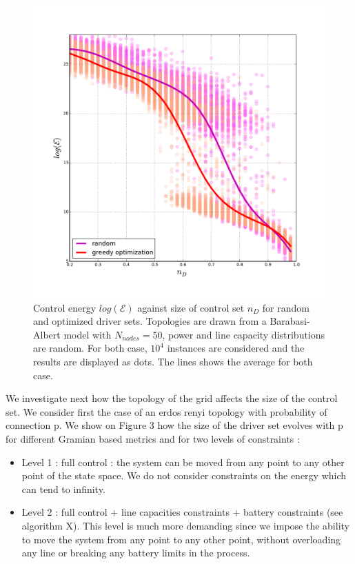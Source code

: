 \documentclass[conference]{IEEEtran}
\begin{document}
\begin{figure}
\label{fig:densities}
\includegraphics[scale=.35]{./figure_3/figure_3}
\caption{Control energy $log(\mathcal{E})$ against size of control set $n_D$ for random and optimized driver sets. Topologies are drawn from a Barabasi-Albert model with $ N_{nodes} = 50 $, power and line capacity distributions are random. For both case, $10^4$ instances are considered and the results are displayed as dots. The lines shows the average for both case. }
\end{figure}

We investigate next how the topology of the grid affects the size of the control set. We consider first the case of an erdos renyi topology with probability of connection p. We show on Figure 3 how the size of the driver set evolves with p for different Gramian based metrics and for two levels of constraints : 

\begin{itemize}
\item Level 1 : full control : the system can be moved from any point to any other point of the state space. We do not consider constraints on the energy which can tend to infinity. 
\item Level 2 : full control + line capacities constraints + battery constraints (see algorithm X). This level is much more demanding since we impose the ability to move the system from any point to any other point, without overloading any line or breaking any battery limits in the process.
\end{itemize}
\end{document}
